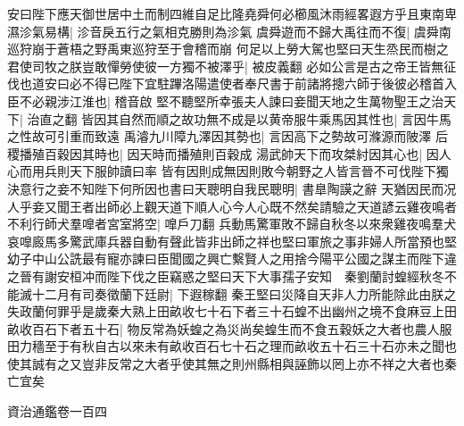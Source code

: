 安曰陛下應天御世居中土而制四維自足比隆堯舜何必櫛風沐雨經畧遐方乎且東南卑濕沴氣易構|{
	沴音戾五行之氣相克勝則為沴氣}
虞舜遊而不歸大禹往而不復|{
	虞舜南巡狩崩于蒼梧之野禹東巡狩至于會稽而崩}
何足以上勞大駕也堅曰天生烝民而樹之君使司牧之朕豈敢憚勞使彼一方獨不被澤乎|{
	被皮義翻}
必如公言是古之帝王皆無征伐也道安曰必不得已陛下宜駐蹕洛陽遣使者奉尺書于前諸將摠六師于後彼必稽首入臣不必親涉江淮也|{
	稽音啟}
堅不聽堅所幸張夫人諫曰妾聞天地之生萬物聖王之治天下|{
	治直之翻}
皆因其自然而順之故功無不成是以黄帝服牛乘馬因其性也|{
	言因牛馬之性故可引重而致遠}
禹濬九川障九澤因其勢也|{
	言因高下之勢故可滌源而陂澤}
后稷播殖百穀因其時也|{
	因天時而播殖則百穀成}
湯武帥天下而攻桀紂因其心也|{
	因人心而用兵則天下服帥讀曰率}
皆有因則成無因則敗今朝野之人皆言晉不可伐陛下獨決意行之妾不知陛下何所因也書曰天聰明自我民聰明|{
	書臯陶謨之辭}
天猶因民而况人乎妾又聞王者出師必上觀天道下順人心今人心既不然矣請驗之天道諺云雞夜鳴者不利行師犬羣嘷者宮室將空|{
	嘷戶刀翻}
兵動馬驚軍敗不歸自秋冬以來衆雞夜鳴羣犬哀嘷廄馬多驚武庫兵器自動有聲此皆非出師之祥也堅曰軍旅之事非婦人所當預也堅幼子中山公詵最有寵亦諫曰臣聞國之興亡繫賢人之用捨今陽平公國之謀主而陛下違之晉有謝安桓冲而陛下伐之臣竊惑之堅曰天下大事孺子安知　秦劉蘭討蝗經秋冬不能滅十二月有司奏徵蘭下廷尉|{
	下遐稼翻}
秦王堅曰災降自天非人力所能除此由朕之失政蘭何罪乎是歲秦大熟上田畝收七十石下者三十石蝗不出幽州之境不食麻豆上田畝收百石下者五十石|{
	物反常為妖蝗之為災尚矣蝗生而不食五穀妖之大者也農人服田力穡至于有秋自古以來未有畝收百石七十石之理而畝收五十石三十石亦未之聞也使其誠有之又豈非反常之大者乎使其無之則州縣相與誣飾以罔上亦不祥之大者也秦亡宜矣}


資治通鑑卷一百四
